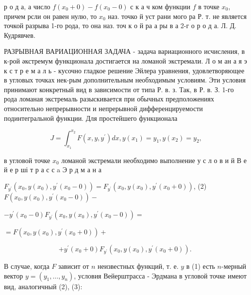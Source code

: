 \documentclass[10pt]{article}
\begin{document}
р о д а, а число $f\left(x_{0}+0\right)-f\left(x_{0}-0\right)$ с к а ч ком функции $f$ в точке $x_{0}$, причем рсли он равен нулю, то $x_{0}$ наз. точко й уст рани мого ра Р. т. не является точкой разрыва 1-го рода, то она наз. точ к о й ра $а$ ры в а 2-г о р о д а. Л. Д. Кудрявчев.



РАЗРЫВНАЯ ВАРИАЦИОННАЯ ЗАДАЧА - задача вариационного исчисления, в к-рой әкстремум функционала достигается на ломаной экстремали. Л о м ан а я э к с т р е м а л ь - кусочно гладкое решение Эйлера уравнения, удовлетворяющее в угловых точках нек-рым дополнительным необходимым условиям. Эти условия принимают конкретный вид в зависимости от типа Р. в. з. Так, в Р. в. З. 1-го рода ломаная экстремаль разыскивается при обычных предположениях относительно непрерывности и непрерывной дифференцируемости подинтегральной функции. Для простейшего функционала



\[

J=\int_{x_{1}}^{x_{2}} F\left(x, y, y^{\prime}\right) d x, y\left(x_{1}\right)=y_{1}, y\left(x_{2}\right)=y_{2},

\]



в угловой точке $x_{0}$ ломаной экстремали необходимо выполнение у с л о в и й В е й е р ші т р а с с a Э р д м а н а



$F_{y^{\prime}}\left(x_{0}, y\left(x_{0}\right), y^{\prime}\left(x_{0}-0\right)\right)=F_{y^{\prime}}\left(x_{0}, y\left(x_{0}\right), y^{\prime}\left(x_{0}+0\right)\right)$, (2) $F\left(x_{0}, y\left(x_{0}\right), y^{\prime}\left(x_{0}-0\right)\right)-$



$-y^{\prime}\left(x_{0}-0\right) F_{y^{\prime}}\left(x_{0}, y\left(x_{0}\right), y^{\prime}\left(x_{0}-0\right)\right)=$



$=F\left(x_{0}, y\left(x_{0}\right), y^{\prime}\left(x_{0}+0\right)\right)+$



\[

+y^{\prime}\left(x_{0}+0\right) F_{y^{\prime}}\left(x_{0}, y\left(x_{0}\right), y^{\prime}\left(x_{0}+0\right)\right) \text {. }

\]



В случае, когда $F$ зависит от $n$ неизвестных функций, т. е. $y$ в (1) есть $n$-мерный вектор $y=\left(y_{1}, \ldots, y_{n}\right)$, условия Вейерштрасса - Эрдмана в угловой точке имеют вид, аналогичный (2), (3):
\end{document}
